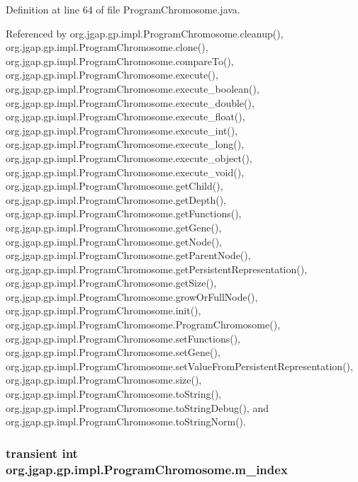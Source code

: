 Definition at line 64 of file Program\-Chromosome.\-java.



Referenced by org.\-jgap.\-gp.\-impl.\-Program\-Chromosome.\-cleanup(), org.\-jgap.\-gp.\-impl.\-Program\-Chromosome.\-clone(), org.\-jgap.\-gp.\-impl.\-Program\-Chromosome.\-compare\-To(), org.\-jgap.\-gp.\-impl.\-Program\-Chromosome.\-execute(), org.\-jgap.\-gp.\-impl.\-Program\-Chromosome.\-execute\-\_\-boolean(), org.\-jgap.\-gp.\-impl.\-Program\-Chromosome.\-execute\-\_\-double(), org.\-jgap.\-gp.\-impl.\-Program\-Chromosome.\-execute\-\_\-float(), org.\-jgap.\-gp.\-impl.\-Program\-Chromosome.\-execute\-\_\-int(), org.\-jgap.\-gp.\-impl.\-Program\-Chromosome.\-execute\-\_\-long(), org.\-jgap.\-gp.\-impl.\-Program\-Chromosome.\-execute\-\_\-object(), org.\-jgap.\-gp.\-impl.\-Program\-Chromosome.\-execute\-\_\-void(), org.\-jgap.\-gp.\-impl.\-Program\-Chromosome.\-get\-Child(), org.\-jgap.\-gp.\-impl.\-Program\-Chromosome.\-get\-Depth(), org.\-jgap.\-gp.\-impl.\-Program\-Chromosome.\-get\-Functions(), org.\-jgap.\-gp.\-impl.\-Program\-Chromosome.\-get\-Gene(), org.\-jgap.\-gp.\-impl.\-Program\-Chromosome.\-get\-Node(), org.\-jgap.\-gp.\-impl.\-Program\-Chromosome.\-get\-Parent\-Node(), org.\-jgap.\-gp.\-impl.\-Program\-Chromosome.\-get\-Persistent\-Representation(), org.\-jgap.\-gp.\-impl.\-Program\-Chromosome.\-get\-Size(), org.\-jgap.\-gp.\-impl.\-Program\-Chromosome.\-grow\-Or\-Full\-Node(), org.\-jgap.\-gp.\-impl.\-Program\-Chromosome.\-init(), org.\-jgap.\-gp.\-impl.\-Program\-Chromosome.\-Program\-Chromosome(), org.\-jgap.\-gp.\-impl.\-Program\-Chromosome.\-set\-Functions(), org.\-jgap.\-gp.\-impl.\-Program\-Chromosome.\-set\-Gene(), org.\-jgap.\-gp.\-impl.\-Program\-Chromosome.\-set\-Value\-From\-Persistent\-Representation(), org.\-jgap.\-gp.\-impl.\-Program\-Chromosome.\-size(), org.\-jgap.\-gp.\-impl.\-Program\-Chromosome.\-to\-String(), org.\-jgap.\-gp.\-impl.\-Program\-Chromosome.\-to\-String\-Debug(), and org.\-jgap.\-gp.\-impl.\-Program\-Chromosome.\-to\-String\-Norm().

\hypertarget{classorg_1_1jgap_1_1gp_1_1impl_1_1_program_chromosome_a05a7b989fa9e7a7526b3c796bf033fe3}{
\subsubsection[{m\-\_\-index}]{\setlength{\rightskip}{0pt plus 5cm}transient int org.\-jgap.\-gp.\-impl.\-Program\-Chromosome.\-m\-\_\-index\hspace{0.3cm}{\ttfamily [private]}}}\label{classorg_1_1jgap_1_1gp_1_1impl_1_1_program_chromosome_a05a7b989fa9e7a7526b3c796bf033fe3}


